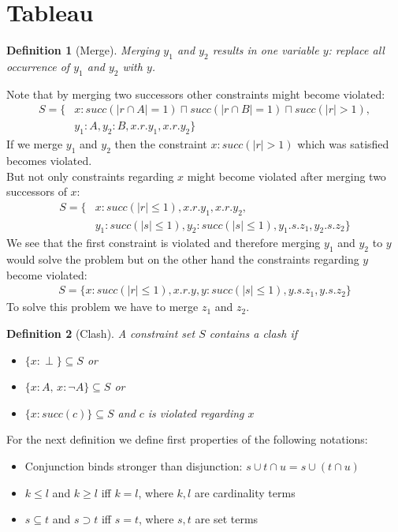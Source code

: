 \documentclass[a4paper,11pt]{scrartcl}
\theoremstyle{break}
\newtheorem{mydef}{Definition}
\begin{document}
\section{Tableau}
\begin{mydef}[Merge]
\textit{Merging} $y_1$ and $y_2$ results in one variable $y$: replace all occurrence of $y_1$ and $y_2$ with $y$. 
\end{mydef}
Note that by merging two successors other constraints might become violated:
\begin{align}
S=\{&x:succ(|r\cap A|=1)\sqcap succ(|r\cap B|=1)\sqcap succ(|r|>1),\nonumber\\ &y_1:A, y_2:B, x.r.y_1, x.r.y_2\}
\end{align}
If we merge $y_1$ and $y_2$ then the constraint $x:succ(|r|>1)$ which was satisfied becomes violated.\\
But not only constraints regarding $x$ might become violated after merging two successors of $x$: 
\begin{align}
S=\{&x:succ(|r|\leq 1), x.r.y_1, x.r.y_2,\nonumber
\\&y_1:succ(|s|\leq 1), y_2:succ(|s|\leq 1), y_1.s.z_1, y_2.s.z_2\}
\end{align}
We see that the first constraint is violated and therefore merging $y_1$ and $y_2$ to $y$ would solve the problem but on the other hand the constraints regarding $y$ become violated: 
\begin{align*}
S=\{x:succ(|r|\leq 1), x.r.y,
y:succ(|s|\leq 1), y.s.z_1, y.s.z_2\}
\end{align*}
To solve this problem we have to merge $z_1$ and $z_2$.
\begin{mydef}[Clash]
A constraint set $S$ contains a \textit{clash} if
\begin{itemize}
\item $\{x:\perp\}\subseteq S$ or
\item $\{x:A,\,x:\neg A\}\subseteq S$ or
\item $\{x:succ(c)\}\subseteq S$ and $c$ is violated regarding $x$
\end{itemize}
\end{mydef}
For the next definition we define first properties of the following notations:
\begin{itemize}
\item Conjunction binds stronger than disjunction: $s\cup t\cap u = s\cup (t\cap u)$
\item $k\leq l$ and $k\geq l$ iff $k=l$, where $k,l$ are cardinality terms
\item $s\subseteq t$ and $s\supset t$ iff $s=t$, where $s,t$ are set terms
\end{itemize}
\end{document}
